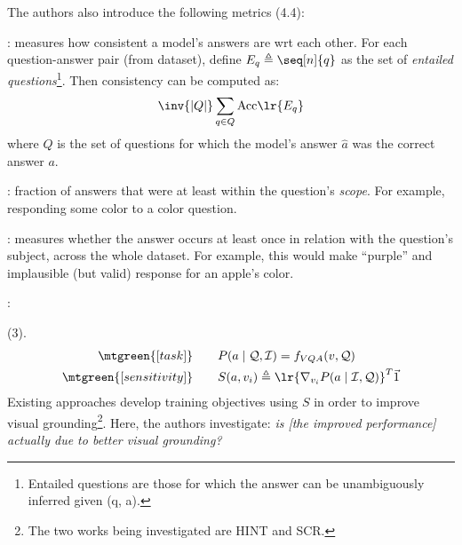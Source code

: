 \documentclass[11pt]{article}
\begin{document}
The authors also introduce the following metrics (4.4):
\begin{compactitem}
	\item {}: measures how consistent a model's answers are wrt each other. For each question-answer pair (from dataset), define $E_q \triangleq  \seq[n]{q}$ as the set of \textit{entailed questions}\footnote{Entailed questions are those for which the answer can be unambiguously inferred given (q, a).}. Then consistency can be computed as:
	\begin{align}
		\inv{|Q|} \sum_{q \in Q} \text{Acc} \lr{ E_q}
	\end{align}
	where $Q$ is the set of questions for which the model's answer $\hat a$ was the correct answer $a$. 
	
	\item {}: fraction of answers that were at least within the question's \textit{scope}. For example, responding some color to a color question. 
	
	\item {}: measures whether the answer occurs at least once in relation with the question's subject, across the whole dataset. For example, this would make ``purple'' and implausible (but valid) response for an apple's color.
	
	\item {}: 
\end{compactitem}










 (3). 
\begin{align}
	\mtgreen{[task]}& \qquad
		P(a \mid \mathcal Q, \mathcal I) = f_{VQA}(v, \mathcal Q) \\
	\mtgreen{[sensitivity]}& \qquad
		S(a, v_i) \triangleq  \lr{  \nabla_{v_i} P(a \mid \mathcal I, \mathcal Q)   }^T \vec 1
\end{align}
Existing approaches develop training objectives using $S$ in order to improve visual grounding\footnote{The two works being investigated are HINT and SCR.}. Here, the authors investigate: \textit{is [the improved performance] actually due to better visual grounding?}
\end{document}
